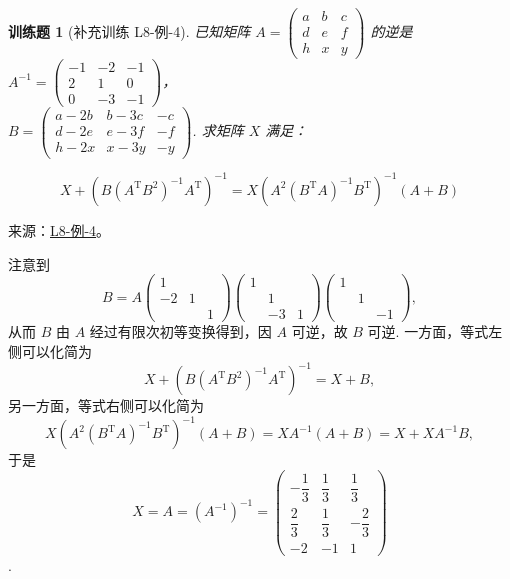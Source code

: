 \documentclass[12pt,fontset=fandol]{ctexart}
\newtheorem{exercise}{训练题}[section]
\begin{document}
\begin{exercise}[补充训练 L8-例-4]\label{prob:L8-例-4}
已知矩阵 $A=\begin{pmatrix}a & b & c \\ d & e & f \\ h & x & y\end{pmatrix}$ 的逆是 $A^{-1}=\begin{pmatrix}-1 & -2 & -1 \\ 2 & 1 & 0 \\ 0 & -3 & -1\end{pmatrix}$，\\
    $B=\begin{pmatrix}a-2b & b-3c & -c \\ d-2e & e-3f & -f \\ h-2x & x-3y & -y\end{pmatrix}$. 求矩阵 $X$ 满足：

    \[X+\left(B(A^\mathrm{T}B^2)^{-1}A^\mathrm{T}\right)^{-1}=X\left(A^2(B^\mathrm{T}A)^{-1}B^\mathrm{T}\right)^{-1}(A+B)\]
\end{exercise}
\noindent 来源：\href{https://github.com/yhwu-is/Linear-Algebra-Left-Undone/blob/new/%E8%AE%B2%E4%B9%89/%E4%B8%93%E9%A2%98/8%20%E7%9B%B8%E6%8A%B5%E6%A0%87%E5%87%86%E5%BD%A2.tex}{L8-例-4}。
\begin{solve}
注意到
    \[B=A\begin{pmatrix}
            1 &  & \\ -2 & 1 & \\ & & 1
        \end{pmatrix} \begin{pmatrix}
            1 &  & \\ & 1 & \\ & -3 & 1
        \end{pmatrix} \begin{pmatrix}
            1 &  & \\ & 1 & \\ & & -1
        \end{pmatrix},\]
    从而 $B$ 由 $A$ 经过有限次初等变换得到，因 $A$ 可逆，故 $B$ 可逆. 一方面，等式左侧可以化简为
    \[X + \left(B\left(A^\mathrm{T} B^{2}\right)^{-1} A^\mathrm{T}\right)^{-1} = X + B,\]
    另一方面，等式右侧可以化简为
    \[X\left(A^{2}\left(B^\mathrm{T} A\right)^{-1} B^\mathrm{T}\right)^{-1}(A + B) = X A^{-1}(A + B) = X + X A^{-1} B,\]
    于是 
\[X = A = (A^{-1})^{-1} = \begin{pmatrix}
            -\dfrac{1}{3} & \dfrac{1}{3} & \dfrac{1}{3}  \\[0.5em]
            \dfrac{2}{3}  & \dfrac{1}{3} & -\dfrac{2}{3} \\
            -2           & -1          & 1
        \end{pmatrix}\]
.
\end{solve}
\end{document}
